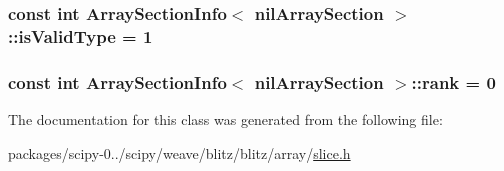 \subsubsection[{is\+Valid\+Type}]{\setlength{\rightskip}{0pt plus 5cm}const int {\bf Array\+Section\+Info}$<$ {\bf nil\+Array\+Section} $>$\+::is\+Valid\+Type = 1\hspace{0.3cm}{\ttfamily [static]}}\label{classArraySectionInfo_3_01nilArraySection_01_4_acca4a9cf0f1aaf88ed29b38db9c402cf}
\hypertarget{classArraySectionInfo_3_01nilArraySection_01_4_ae2b3a2216bbca26ef42f990a706df85d}{}
\subsubsection[{rank}]{\setlength{\rightskip}{0pt plus 5cm}const int {\bf Array\+Section\+Info}$<$ {\bf nil\+Array\+Section} $>$\+::rank = 0\hspace{0.3cm}{\ttfamily [static]}}\label{classArraySectionInfo_3_01nilArraySection_01_4_ae2b3a2216bbca26ef42f990a706df85d}


The documentation for this class was generated from the following file\+:\begin{DoxyCompactItemize}
\item 
packages/scipy-\/0../scipy/weave/blitz/blitz/array/\hyperlink{slice_8h}{slice.\+h}\end{DoxyCompactItemize}

